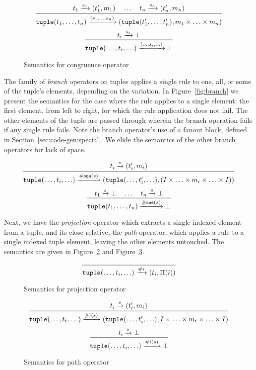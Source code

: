 \begin{figure}[ht]
\[
\infer
  {\mathtt{tuple}(t_1,\ldots,t_n)\arr{(s_1,\ldots,s_n)} (\mathtt{tuple}(t_1',\ldots,t_n'),m_1 \times \ldots \times m_n) }
  {t_1 \arr{s_1} (t_1',m_1) \quad \ldots \quad t_n \arr{s_n} (t_n',m_n)}
\]
\[
\infer
  {\mathtt{tuple}(\ldots,t_i,\ldots)\arr{(\ldots,s_i,\ldots)}\bot}
  {t_i \arr{s_i} \bot}
\]
\caption{Semantics for congruence operator}
\label{fig:congruence}
\end{figure}

The family of \emph{branch} operators on tuples applies a single rule to one, all, or some of the tuple's elements, depending on the variation. In Figure~\ref{fig:branch} we present the semantics for the case where the rule applies to a single element: the first element, from left to right, for which the rule application does not fail. The other elements of the tuple are passed through wherein the branch operation fails if any single rule fails. Note the branch operator's use of a fanout block, defined in Section~\ref{sec:code-gen:special}. We elide the semantics of the other branch operators for lack of space.

\begin{figure*}[ht]
\[
\infer
  {\mathtt{tuple}(\ldots,t_i,\ldots) \arr{\mathtt{\#one}(s)} (\mathtt{tuple}(\ldots,t_i',\ldots),(I \times \ldots \times m_i \times \ldots \times I))}
  {t_i \arr{s} (t_i',m_i)}
\]
\[
\infer
  {\mathtt{tuple}(t_1,\ldots,t_n) \arr{\mathtt{\#one}(s)} \bot}
  {t_1 \arr{s} \bot \quad \ldots \quad t_n \arr{s} \bot}
\]
\caption{Semantics for branch-one operator}
\label{fig:branch}
\end{figure*}

Next, we have the \emph{projection} operator which extracts a single indexed element from a tuple, and its close relative, the \emph{path} operator, which applies a rule to a single indexed tuple element, leaving the other elements untouched. The semantics are given in Figure~\ref{fig:projection} and Figure~\ref{fig:path}.

\begin{figure}[ht]
\[
\infer
  {\mathtt{tuple}(\ldots,t_i,\ldots) \arr{\#i} (t_i,\Pi(i))}
  {}
\]
\caption{Semantics for projection operator}
\label{fig:projection}
\end{figure}

\begin{figure}[ht]
\[
\infer
  {\mathtt{tuple}(\ldots,t_i,\ldots) \arr{\#i(s)} (\mathtt{tuple}(\ldots,t_i',\ldots), I \times \ldots \times m_i \times \ldots \times I)}
  {t_i \arr{s} (t_i',m_i)}
\]
\[
\infer
  {\mathtt{tuple}(\ldots,t_i,\ldots) \arr{\#i(s)} \bot}
  {t_i \arr{s} \bot}
\]
\caption{Semantics for path operator}
\label{fig:path}
\end{figure}

